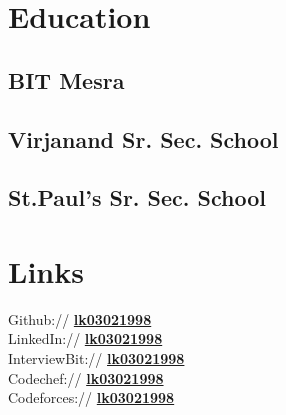 \documentclass[]{deedy-resume-openfont}
\begin{document}
%
%
\lastupdated

%
%

%
%

\begin{minipage}[t]{0.33\textwidth} 


\section{Education} 
\sectionsep
\subsection{BIT Mesra}
\sectionsep
\sectionsep
\subsection{Virjanand Sr. Sec. School}
\sectionsep
\sectionsep
\subsection{St.Paul's Sr. Sec. School}
\sectionsep
\sectionsep

\section{Links} 
\textmd{Github://} \href{https://github.com/lk03021998}{\bf lk03021998} \\
\textmd{LinkedIn://}  \href{https://www.linkedin.com/in/lk03021998/}{\bf lk03021998}\\
\textmd{InterviewBit://}  \href{https://www.interviewbit.com/profile/lakshay-khandelwal}{\bf lk03021998}\\
\textmd{Codechef://}  \href{https://www.codechef.com/users/lk03021998}{\bf lk03021998}\\
\textmd{Codeforces://}  \href{https://codeforces.com/profile/Lk03021998}{\bf lk03021998}\\
\sectionsep


\end{minipage}
\end{document}
